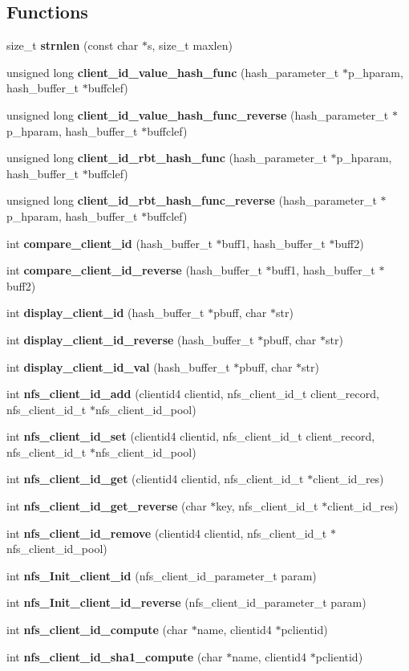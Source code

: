 \subsection*{Functions}
\begin{CompactItemize}
\item 
size\_\-t {\bf strnlen} (const char $\ast$s, size\_\-t maxlen)
\item 
unsigned long {\bf client\_\-id\_\-value\_\-hash\_\-func} (hash\_\-parameter\_\-t $\ast$p\_\-hparam, hash\_\-buffer\_\-t $\ast$buffclef)
\item 
unsigned long {\bf client\_\-id\_\-value\_\-hash\_\-func\_\-reverse} (hash\_\-parameter\_\-t $\ast$p\_\-hparam, hash\_\-buffer\_\-t $\ast$buffclef)
\item 
unsigned long {\bf client\_\-id\_\-rbt\_\-hash\_\-func} (hash\_\-parameter\_\-t $\ast$p\_\-hparam, hash\_\-buffer\_\-t $\ast$buffclef)
\item 
unsigned long {\bf client\_\-id\_\-rbt\_\-hash\_\-func\_\-reverse} (hash\_\-parameter\_\-t $\ast$p\_\-hparam, hash\_\-buffer\_\-t $\ast$buffclef)
\item 
int {\bf compare\_\-client\_\-id} (hash\_\-buffer\_\-t $\ast$buff1, hash\_\-buffer\_\-t $\ast$buff2)
\item 
int {\bf compare\_\-client\_\-id\_\-reverse} (hash\_\-buffer\_\-t $\ast$buff1, hash\_\-buffer\_\-t $\ast$buff2)
\item 
int {\bf display\_\-client\_\-id} (hash\_\-buffer\_\-t $\ast$pbuff, char $\ast$str)
\item 
int {\bf display\_\-client\_\-id\_\-reverse} (hash\_\-buffer\_\-t $\ast$pbuff, char $\ast$str)
\item 
int {\bf display\_\-client\_\-id\_\-val} (hash\_\-buffer\_\-t $\ast$pbuff, char $\ast$str)
\item 
int {\bf nfs\_\-client\_\-id\_\-add} (clientid4 clientid, nfs\_\-client\_\-id\_\-t client\_\-record, nfs\_\-client\_\-id\_\-t $\ast$nfs\_\-client\_\-id\_\-pool)
\item 
int {\bf nfs\_\-client\_\-id\_\-set} (clientid4 clientid, nfs\_\-client\_\-id\_\-t client\_\-record, nfs\_\-client\_\-id\_\-t $\ast$nfs\_\-client\_\-id\_\-pool)
\item 
int {\bf nfs\_\-client\_\-id\_\-get} (clientid4 clientid, nfs\_\-client\_\-id\_\-t $\ast$client\_\-id\_\-res)
\item 
int {\bf nfs\_\-client\_\-id\_\-get\_\-reverse} (char $\ast$key, nfs\_\-client\_\-id\_\-t $\ast$client\_\-id\_\-res)
\item 
int {\bf nfs\_\-client\_\-id\_\-remove} (clientid4 clientid, nfs\_\-client\_\-id\_\-t $\ast$nfs\_\-client\_\-id\_\-pool)
\item 
int {\bf nfs\_\-Init\_\-client\_\-id} (nfs\_\-client\_\-id\_\-parameter\_\-t param)
\item 
int {\bf nfs\_\-Init\_\-client\_\-id\_\-reverse} (nfs\_\-client\_\-id\_\-parameter\_\-t param)
\item 
int {\bf nfs\_\-client\_\-id\_\-compute} (char $\ast$name, clientid4 $\ast$pclientid)
\item 
int {\bf nfs\_\-client\_\-id\_\-sha1\_\-compute} (char $\ast$name, clientid4 $\ast$pclientid)
\end{CompactItemize}
